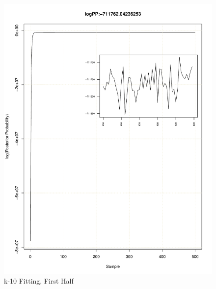 \documentclass[11pt]{labbook}
\begin{document}
    \begin{figure}
        \centering
        \includegraphics[scale=.65]{FONSE_Plots/2016/December_14/k-10_loglike5000}
        \caption{k-10 Fitting, First Half}
        \label{fig:k-10_1LIK}
    \end{figure}
\end{document}
